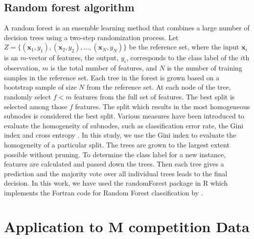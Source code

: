 \documentclass[11pt,a4paper,]{article}
\theoremstyle{definition}
\theoremstyle{definition}
\theoremstyle{definition}
\theoremstyle{remark}
\begin{document}
\subsection{Random forest algorithm}\label{random-forest-algorithm}

A random forest \autocite{breiman2001random} is an ensemble learning
method that combines a large number of decision trees using a two-step
randomization process. Let
\(Z=\{(\bm{x}_1, y_1), (\bm{x}_2, y_2), \dots, (\bm{x}_N, y_N)\}\) be
the reference set, where the input \(\bm{x}_i\) is an \(m\)-vector of
features, the output, \(y_i\), corresponds to the class label of the
\(i\)th observation, \(m\) is the total number of features, and \(N\) is
the number of training samples in the reference set. Each tree in the
forest is grown based on a bootstrap sample of size \(N\) from the
reference set. At each node of the tree, randomly select \(f<m\)
features from the full set of features. The best split is selected among
those \(f\) features. The split which results in the most homogeneous
subnodes is considered the best split. Various measures have been
introduced to evaluate the homogeneity of subnodes, such as
classification error rate, the Gini index and cross entropy
\autocite{friedman2001elements}. In this study, we use the Gini index to
evaluate the homogeneity of a particular split. The trees are grown to
the largest extent possible without pruning. To determine the class
label for a new instance, features are calculated and passed down the
trees. Then each tree gives a prediction and the majority vote over all
individual trees leads to the final decision. In this work, we have used
the randomForest package \autocites{liaw2002randomforest}[;][]{rfpkg} in
R \autocite{Rcore} which implements the Fortran code for Random Forest
classification by \textcite{breiman2004random}.

\section{Application to M competition Data}\label{Mcomp}
\end{document}
